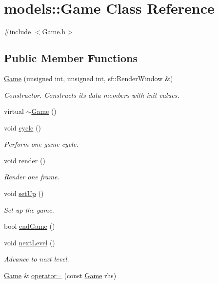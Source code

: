 \hypertarget{classmodels_1_1Game}{\section{models\-:\-:\-Game \-Class \-Reference}
\label{d1/d10/classmodels_1_1Game}
}


{\ttfamily \#include $<$\-Game.\-h$>$}

\subsection*{\-Public \-Member \-Functions}
\begin{DoxyCompactItemize}
\item 
\hyperlink{classmodels_1_1Game_a85dec1f7a60ae8186c365ec2efdae935}{\-Game} (unsigned int, unsigned int, sf\-::\-Render\-Window \&)
\begin{DoxyCompactList}\small\item\em \-Constructor. \-Constructs its data members with init values. \end{DoxyCompactList}\item 
virtual \hyperlink{classmodels_1_1Game_ad6e6eb7b7a5c6939b516a60675c50b24}{$\sim$\-Game} ()
\item 
void \hyperlink{classmodels_1_1Game_a30a27b13488119c9a9f0bd7d495d15e8}{cycle} ()
\begin{DoxyCompactList}\small\item\em \-Perform one game cycle. \end{DoxyCompactList}\item 
void \hyperlink{classmodels_1_1Game_a38b9def8205c6cd4fd9d47c998630c06}{render} ()
\begin{DoxyCompactList}\small\item\em \-Render one frame. \end{DoxyCompactList}\item 
void \hyperlink{classmodels_1_1Game_a99432743b4653c203206b9d16247d5fb}{set\-Up} ()
\begin{DoxyCompactList}\small\item\em \-Set up the game. \end{DoxyCompactList}\item 
bool \hyperlink{classmodels_1_1Game_ac25ef390a1971452e9e11487ac921452}{end\-Game} ()
\item 
void \hyperlink{classmodels_1_1Game_a7f60260cbabc90392de533dc5d0c05be}{next\-Level} ()
\begin{DoxyCompactList}\small\item\em \-Advance to next level. \end{DoxyCompactList}\item 
\hyperlink{classmodels_1_1Game}{\-Game} \& \hyperlink{classmodels_1_1Game_af4ed76a8886164e57ef756f1d31e8205}{operator=} (const \hyperlink{classmodels_1_1Game}{\-Game} rhs)
\end{DoxyCompactItemize}
